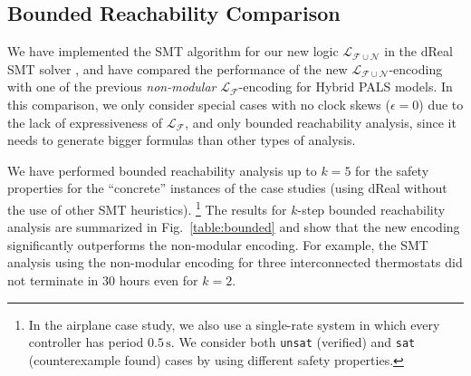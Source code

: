 \subsection{Bounded Reachability Comparison}
\label{sec:expr}

We have implemented the SMT algorithm
for our new logic $\mathcal{L}_{\mathcal{F}\cup\mathcal{N}}$ in the \textsf{dReal} SMT solver \cite{dReal},
and have compared the performance of 
the new $\mathcal{L}_{\mathcal{F}\cup\mathcal{N}}$-encoding
with one of the previous \emph{non-modular} $\mathcal{L}_{\mathcal{F}}$-encoding  for Hybrid PALS models.
%
In this comparison,
we only consider special cases %
with no clock skews ($\epsilon = 0$) 
due to the lack of expressiveness of  $\mathcal{L}_{\mathcal{F}}$,
and only bounded reachability analysis, 
since it needs to generate bigger formulas than other types of analysis.


We have performed bounded reachability analysis up to $k = 5$
for the safety properties for the ``concrete'' instances of the case studies
(using \textsf{dReal} without the use of other SMT heuristics).%
\footnote{In the airplane case study, we also use a single-rate system
in which every controller has period $0.5\,\mathrm{s}$.
We consider both \texttt{unsat} (verified) and \texttt{sat}  (counterexample found) cases
by using different safety properties.}
%
The results for $k$-step bounded reachability analysis 
are summarized  in Fig.~\ref{table:bounded} and show that
the new encoding significantly outperforms 
the non-modular encoding.
For example, 
the SMT analysis using the non-modular encoding
for three interconnected thermostats
 did not terminate in  $30$ hours
even for $k = 2$.


